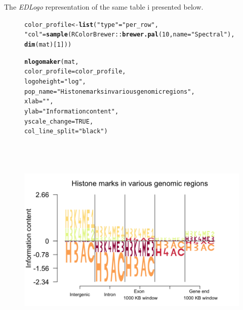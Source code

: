 \documentclass[12pt]{article}\usepackage[]{graphicx}\usepackage[usenames,dvipsnames]{color}
\makeatletter
\newcommand{\hlnum}[1]{\textcolor[rgb]{0.686,0.059,0.569}{#1}}%
\newcommand{\hlstr}[1]{\textcolor[rgb]{0.192,0.494,0.8}{#1}}%
\newcommand{\hlopt}[1]{\textcolor[rgb]{0,0,0}{#1}}%
\newcommand{\hlstd}[1]{\textcolor[rgb]{0.345,0.345,0.345}{#1}}%
\newcommand{\hlkwb}[1]{\textcolor[rgb]{0.69,0.353,0.396}{#1}}%
\newcommand{\hlkwc}[1]{\textcolor[rgb]{0.333,0.667,0.333}{#1}}%
\newcommand{\hlkwd}[1]{\textcolor[rgb]{0.737,0.353,0.396}{\textbf{#1}}}%
\newenvironment{kframe}{%
 \def\at@end@of@kframe{}%
 \ifinner\ifhmode%
  \def\at@end@of@kframe{\end{minipage}}%
  \begin{minipage}{\columnwidth}%
 \fi\fi%
 \def\FrameCommand##1{\hskip\@totalleftmargin \hskip-\fboxsep
 \colorbox{shadecolor}{##1}\hskip-\fboxsep
     \hskip-\linewidth \hskip-\@totalleftmargin \hskip\columnwidth}%
 \MakeFramed {\advance\hsize-\width
   \@totalleftmargin\z@ \linewidth\hsize
   \@setminipage}}%
 {\par\unskip\endMakeFramed%
 \at@end@of@kframe}
\newenvironment{knitrout}{}{} %
\makeatother
\begin{document}
\newpage

The \textit{EDLogo} representation of the same table i presented below.

\begin{figure}[h]
\begin{center}
\begin{knitrout}
\color{fgcolor}\begin{kframe}
\begin{alltt}
\hlstd{color_profile} \hlkwb{<-} \hlkwd{list}\hlstd{(}\hlstr{"type"} \hlstd{=} \hlstr{"per_row"}\hlstd{,}
                      \hlstr{"col"} \hlstd{=} \hlkwd{sample}\hlstd{(RColorBrewer}\hlopt{::}\hlkwd{brewer.pal}\hlstd{(}\hlnum{10}\hlstd{,}\hlkwc{name} \hlstd{=} \hlstr{"Spectral"}\hlstd{),}
                          \hlkwd{dim}\hlstd{(mat)[}\hlnum{1}\hlstd{]))}

\hlkwd{nlogomaker}\hlstd{(mat,}
          \hlkwc{color_profile} \hlstd{= color_profile,}
          \hlkwc{logoheight} \hlstd{=} \hlstr{"log"}\hlstd{,}
          \hlkwc{pop_name} \hlstd{=} \hlstr{"Histone marks in various genomic regions"}\hlstd{,}
          \hlkwc{xlab} \hlstd{=} \hlstr{""}\hlstd{,}
          \hlkwc{ylab} \hlstd{=} \hlstr{"Information content"}\hlstd{,}
          \hlkwc{yscale_change} \hlstd{=} \hlnum{TRUE}\hlstd{,}
          \hlkwc{col_line_split} \hlstd{=} \hlstr{"black"}\hlstd{)}
\end{alltt}
\end{kframe}
\includegraphics[width=6.5in,height=4in]{figure/histone_nlogolas-1} 

\end{knitrout}
\end{center}
\end{figure}
\end{document}
